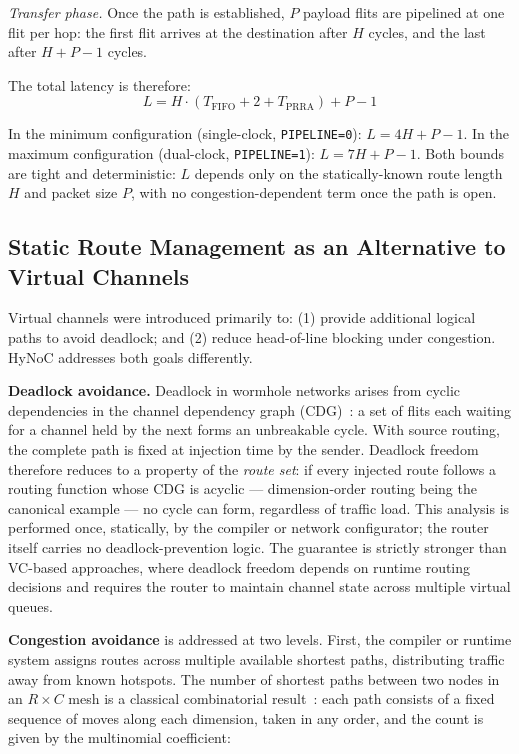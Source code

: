 \emph{Transfer phase.} Once the path is established, $P$ payload flits are
pipelined at one flit per hop: the first flit arrives at the destination after
$H$ cycles, and the last after $H + P - 1$ cycles.

The total latency is therefore:
\begin{equation}
  L = H \cdot (T_\text{FIFO} + 2 + T_\text{PRRA}) + P - 1
  \label{eq:latency}
\end{equation}

In the minimum configuration (single-clock, \texttt{PIPELINE=0}):
$L = 4H + P - 1$.
In the maximum configuration (dual-clock, \texttt{PIPELINE=1}):
$L = 7H + P - 1$.
Both bounds are tight and deterministic: $L$ depends only on the
statically-known route length $H$ and packet size $P$, with no
congestion-dependent term once the path is open.

\subsection{Static Route Management as an Alternative to Virtual Channels}

Virtual channels were introduced primarily to: (1) provide additional logical paths
to avoid deadlock; and (2) reduce head-of-line blocking under congestion. HyNoC
addresses both goals differently.

\textbf{Deadlock avoidance.} Deadlock in wormhole networks arises from cyclic
dependencies in the channel dependency graph (CDG)~\cite{dally1987}: a set of
flits each waiting for a channel held by the next forms an unbreakable cycle.
With source routing, the complete path is fixed at injection time by the sender.
Deadlock freedom therefore reduces to a property of the \emph{route set}: if
every injected route follows a routing function whose CDG is acyclic ---
dimension-order routing being the canonical example --- no cycle can form,
regardless of traffic load. This analysis is performed once, statically, by the
compiler or network configurator; the router itself carries no deadlock-prevention
logic. The guarantee is strictly stronger than VC-based approaches, where
deadlock freedom depends on runtime routing decisions and requires the router to
maintain channel state across multiple virtual queues.

\textbf{Congestion avoidance} is addressed at two levels. First, the compiler or
runtime system assigns routes across multiple available shortest paths, distributing
traffic away from known hotspots. The number of shortest paths between two nodes in
an $R \times C$ mesh is a classical combinatorial result~\cite{knuth1997}: each path consists of a fixed sequence of moves along each dimension, taken in any order, and the count is given by the multinomial coefficient:

